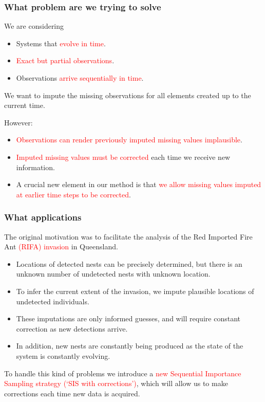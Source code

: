 \documentclass[9pt, xcolor={dvipsnames,svgnames,table}]{beamer}
\begin{document}
\begin{frame}
\frametitle{What problem are we trying to solve}
We are considering
\begin{itemize}
\setlength\itemsep{1em}
    \item Systems that \textcolor{Red}{evolve in time}.
    \item \textcolor{Red}{Exact but partial observations}.
    \item Observations \textcolor{Red}{arrive sequentially in time}.
\end{itemize}
We want to impute the missing observations for all elements created up to the current time.

However:
\begin{itemize}
\setlength\itemsep{1em}
    \item \textcolor{Red}{Observations can render previously imputed missing values implausible}.
    \item \textcolor{Red}{Imputed missing values must be corrected} each time we receive new information.
    \item A crucial new element in our method is that \textcolor{Red}{we allow missing values imputed at earlier time steps to be corrected}.
\end{itemize}  
\end{frame}






\begin{frame}
    \frametitle{What applications}
    The original motivation was to facilitate the analysis of the Red Imported Fire Ant \textcolor{Red}{(RIFA) invasion} in Queensland.
    \begin{itemize}
        \item Locations of detected nests can be precisely determined, but there is an unknown number of undetected nests with unknown location. 
        \item To infer the current extent of the invasion, we impute plausible locations of undetected individuals. 
        \item These imputations are only informed guesses, and will require constant correction as new detections arrive. 
        \item In addition, new nests are constantly being produced as the state of the system is constantly evolving.
    \end{itemize}
    To handle this kind of problems we introduce a \textcolor{Red}{new Sequential Importance Sampling  strategy (`SIS with corrections')}, which will allow us to make corrections each time new data is acquired.
\end{frame}
\end{document}
